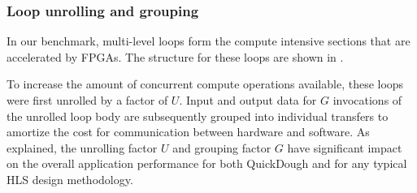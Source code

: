 \begin{table}
\footnotesize 
{}
\end{table}

\subsubsection{Loop unrolling and grouping}
In our benchmark, multi-level loops form the compute intensive sections that are accelerated by FPGAs.
The structure for these loops are shown in .

\begin{table}
\footnotesize 
\end{table}

To increase the amount of concurrent compute operations available, these loops were first unrolled
by a factor of $U$. Input and output data for $G$ invocations of the unrolled loop body are
subsequently grouped into individual transfers to amortize the cost for communication between
hardware and software. As explained, the unrolling factor $U$ and grouping factor $G$ have
significant impact on the overall application performance for both QuickDough and for any typical
HLS design methodology.

